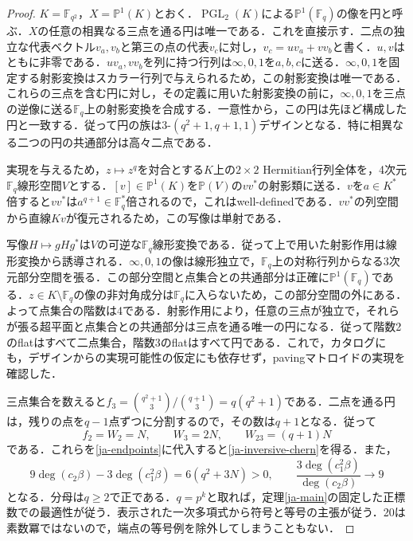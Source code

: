 \documentclass[12pt]{amsart}
\theoremstyle{definition}
\theoremstyle{remark}
\numberwithin{equation}{section}
\begin{document}
\begin{proof}
$K=\mathbb F_{q^2}$，$X=\mathbb P^1(K)$とおく．$\operatorname{PGL}_2(K)$による$\mathbb P^1(\mathbb F_q)$の像を円と呼ぶ．$X$の任意の相異なる三点を通る円は唯一である．これを直接示す．二点の独立な代表ベクトル$v_a,v_b$と第三の点の代表$v_c$に対し，$v_c=u v_a+v v_b$と書く．$u,v$はともに非零である．$u v_a,v v_b$を列に持つ行列は$\infty,0,1$を$a,b,c$に送る．$\infty,0,1$を固定する射影変換はスカラー行列で与えられるため，この射影変換は唯一である．これらの三点を含む円に対し，その定義に用いた射影変換の前に，$\infty,0,1$を三点の逆像に送る$\mathbb F_q$上の射影変換を合成する．一意性から，この円は先ほど構成した円と一致する．従って円の族は$3$-$(q^2+1,q+1,1)$デザインとなる．特に相異なる二つの円の共通部分は高々二点である．

実現を与えるため，$z\mapsto z^q$を対合とする$K$上の$2\times2$ Hermitian行列全体を，4次元$\mathbb F_q$線形空間$V$とする．$[v]\in\mathbb P^1(K)$を$\mathbb P(V)$の$vv^*$の射影類に送る．$v$を$a\in K^*$倍すると$vv^*$は$a^{q+1}\in\mathbb F_q^*$倍されるので，これはwell-definedである．$vv^*$の列空間から直線$Kv$が復元されるため，この写像は単射である．

写像$H\mapsto gHg^*$は$V$の可逆な$\mathbb F_q$線形変換である．従って上で用いた射影作用は線形変換から誘導される．$\infty,0,1$の像は線形独立で，$\mathbb F_q$上の対称行列からなる3次元部分空間を張る．この部分空間と点集合との共通部分は正確に$\mathbb P^1(\mathbb F_q)$である．$z\in K\setminus\mathbb F_q$の像の非対角成分は$\mathbb F_q$に入らないため，この部分空間の外にある．よって点集合の階数は4である．射影作用により，任意の三点が独立で，それらが張る超平面と点集合との共通部分は三点を通る唯一の円になる．従って階数2のflatはすべて二点集合，階数3のflatはすべて円である．これで，カタログにも，デザインからの実現可能性の仮定にも依存せず，pavingマトロイドの実現を確認した．

三点集合を数えると$f_3=\binom{q^2+1}{3}/\binom{q+1}{3}=q(q^2+1)$である．二点を通る円は，残りの点を$q-1$点ずつに分割するので，その数は$q+1$となる．従って
\[
 f_2=W_2=N,\qquad W_3=2N,\qquad W_{23}=(q+1)N
\]
である．これらを\eqref{ja-endpoints}に代入すると\eqref{ja-inversive-chern}を得る．また，
\[
 9\deg(c_2\beta)-3\deg(c_1^2\beta)=6(q^2+3N)>0,
 \qquad\frac{3\deg(c_1^2\beta)}{\deg(c_2\beta)}\longrightarrow9
\]
となる．分母は$q\geq2$で正である．$q=p^k$と取れば，定理\ref{ja-main}の固定した正標数での最適性が従う．表示された一次多項式から符号と等号の主張が従う．20は素数冪ではないので，端点の等号例を除外してしまうこともない．
\end{proof}
\end{document}
